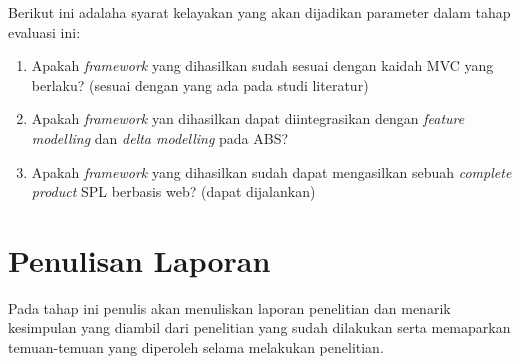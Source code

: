 \noindent
Berikut ini adalaha syarat kelayakan yang akan dijadikan parameter dalam tahap evaluasi ini:

\begin{enumerate}
    \item Apakah \textit{framework} yang dihasilkan sudah sesuai dengan kaidah MVC yang berlaku? (sesuai dengan yang ada pada studi literatur)
    \item Apakah \textit{framework} yan dihasilkan dapat diintegrasikan dengan \textit{feature modelling} dan \textit{delta modelling} pada ABS?
    \item Apakah \textit{framework} yang dihasilkan sudah dapat mengasilkan sebuah \textit{complete product} SPL berbasis web? (dapat dijalankan)
\end{enumerate}

\section{Penulisan Laporan}
Pada tahap ini penulis akan menuliskan laporan penelitian dan menarik kesimpulan yang diambil dari penelitian yang sudah dilakukan serta memaparkan temuan-temuan yang diperoleh selama melakukan penelitian.